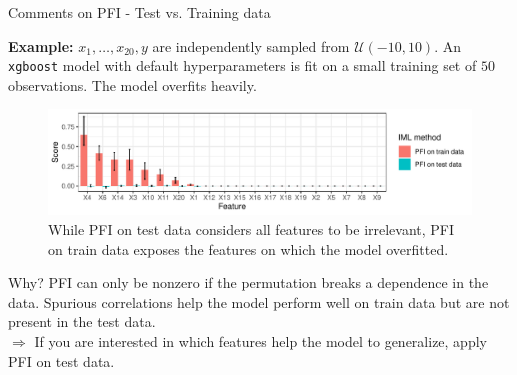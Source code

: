 \documentclass[11pt,compress,t,notes=noshow, aspectratio=169, xcolor=table]{beamer}
\begin{document}
\begin{frame}{Comments on PFI - Test vs. Training data}

\textbf{Example:} $x_1, \dots, x_{20}, y$ are independently sampled from $\mathcal{U} (-10, 10)$. An \texttt{xgboost} model with default hyperparameters is fit on a small training set of $50$ observations. The model overfits heavily.\\

\begin{figure}
  \includegraphics[width=0.9\linewidth]{figure_man/pfi_test_vs_train.pdf}
  \caption{While PFI on test data considers all features to be irrelevant, PFI on train data exposes the features on which the model overfitted.}
\end{figure}

\pause

Why? PFI can only be nonzero if the permutation breaks a dependence in the data. Spurious correlations help the model perform well on train data but are not present in the test data.\\
$\Rightarrow$ If you are interested in which features help the model to generalize, apply PFI on test data.
  
\end{frame}
\end{document}
